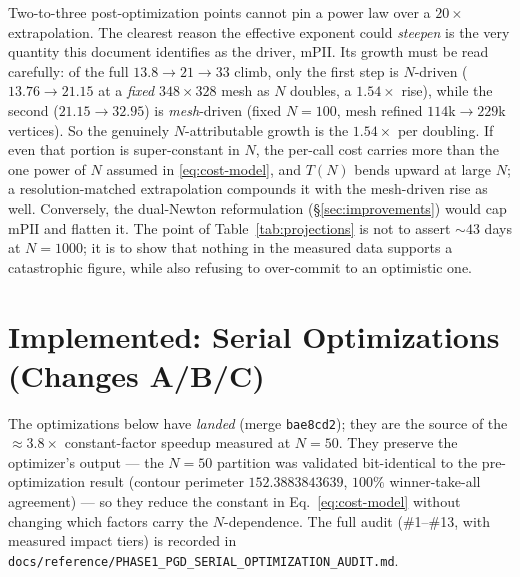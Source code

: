\documentclass[11pt,a4paper]{article}
\begin{document}
\begin{remark}[Why $N=1000$ remains genuinely uncertain]
Two-to-three post-optimization points cannot pin a power law over a $20\times$
extrapolation.  The clearest reason the effective exponent could \emph{steepen}
is the very quantity this document identifies as the driver, $\mathrm{mPII}$.
Its growth must be read carefully: of the full $13.8\to21\to33$ climb, only the
first step is $N$-driven ($13.76\to21.15$ at a \emph{fixed} $348\times328$ mesh
as $N$ doubles, a $1.54\times$ rise), while the second ($21.15\to32.95$) is
\emph{mesh}-driven (fixed $N=100$, mesh refined $114$k$\to229$k vertices).  So
the genuinely $N$-attributable growth is the $1.54\times$ per doubling.  If even
that portion is super-constant in $N$, the per-call cost carries more than the
one power of $N$ assumed in \eqref{eq:cost-model}, and $T(N)$ bends upward at
large $N$; a resolution-matched extrapolation compounds it with the
mesh-driven rise as well.  Conversely, the
dual-Newton reformulation (\S\ref{sec:improvements}) would cap $\mathrm{mPII}$
and flatten it.  The point of Table~\ref{tab:projections} is not to assert
$\sim\!43$ days at $N=1000$; it is to show that nothing in the measured data
supports a catastrophic figure, while also refusing to over-commit to an
optimistic one.
\end{remark}

\section{Implemented: Serial Optimizations (Changes A/B/C)}
\label{sec:serial-opts}

The optimizations below have \emph{landed} (merge \texttt{bae8cd2}); they are
the source of the $\approx\!3.8\times$ constant-factor speedup measured at
$N=50$.  They preserve the optimizer's output --- the $N=50$ partition was
validated bit-identical to the pre-optimization result (contour perimeter
$152.3883843639$, $100\%$ winner-take-all agreement) --- so they reduce the
constant in Eq.~\eqref{eq:cost-model} without changing which factors carry the
$N$-dependence.  The full audit (\#1--\#13, with measured impact tiers) is
recorded in
\texttt{docs/reference/PHASE1\_PGD\_SERIAL\_OPTIMIZATION\_AUDIT.md}.
\end{document}
